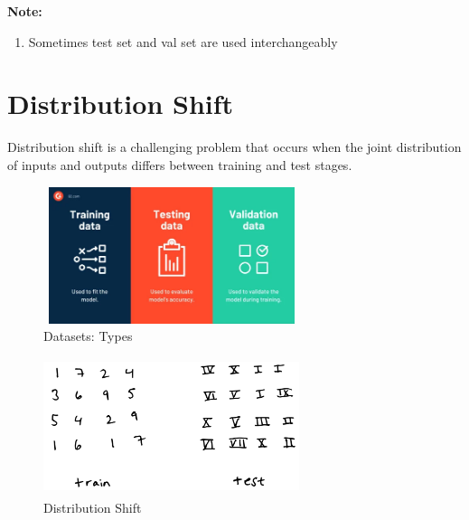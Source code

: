 \vspace{0.2cm}


\textbf{Note:}
\begin{enumerate}
    \item Sometimes test set and val set are used interchangeably
\end{enumerate}

\section{Distribution Shift \cite{dnn-1,mit-imbalance-outliers-shift}}

Distribution shift is a challenging problem that occurs when the joint distribution of inputs and outputs differs between training and test stages.

\begin{table}[H]
    \begin{minipage}{0.45\textwidth}
        \begin{figure}[H]
            \centering
            \includegraphics[width=7.5cm,height=4cm]{Pictures/ml-data/ml-datasets-type.jpg}
            \caption{Datasets: Types}
        \end{figure}
    \end{minipage}
    \hfill
    \begin{minipage}{0.45\textwidth}
        \begin{figure}[H]
            \centering
            \includegraphics[width=7.5cm,height=4cm]{Pictures/ml-data/ml-data-distribution-shift.jpg}
            \caption{Distribution Shift}
        \end{figure}
    \end{minipage}
\end{table}

